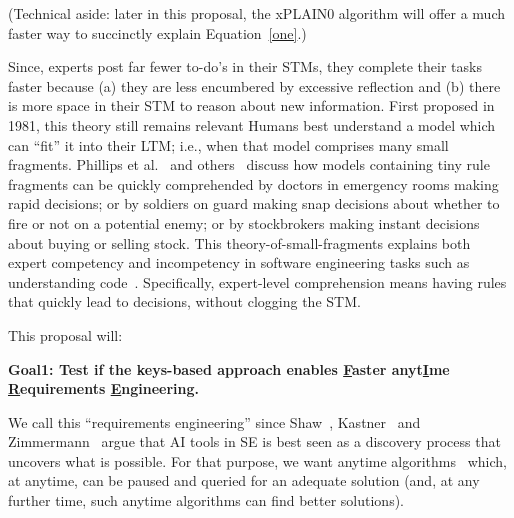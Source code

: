 (Technical aside: later in this proposal,
the xPLAIN0 algorithm will offer a much faster
way to succinctly explain Equation~\ref{one}.)  

 






Since, experts post far fewer to-do's  in their STMs, they complete their tasks faster because (a) they are less encumbered by excessive reflection and (b) there is more space in their STM to reason about new information. 
First proposed in 1981, this   theory  still remains relevant
Humans best understand a model
which can ``fit'' it into their LTM; i.e., when that model comprises many small fragments.
Phillips et al.~\cite{phillips2017FFTrees} and others~\cite{gigerenzer2008heuristics,gigerenzer2011heuristic,czerlinski1999good} discuss how models containing tiny rule fragments can be  quickly comprehended by 
doctors in emergency rooms making rapid  decisions; or by soldiers on guard  making snap decisions about whether to fire or not on a potential enemy; or by  stockbrokers making instant decisions about buying or selling stock.
This theory-of-small-fragments explains both expert competency and incompetency in software
engineering tasks such as understanding code~\cite{Wi96}. 
Specifically,   expert-level comprehension means
having rules that   quickly lead to decisions, without clogging the STM.

 


This proposal will:
  
  \begin{center}
 {\bf Goal1: Test if the keys-based {\IT} approach     enables
          \underline{F}aster 
               anyt\underline{I}me 
                \underline{R}equirements 
                \underline{E}ngineering.
                }
 \end{center}
We call this ``requirements engineering''  
 since   Shaw~\cite{shaw1980becoming}, Kastner~\cite{kastner20}
 and Zimmermann~\cite{timzim13} argue that 
 AI tools  in SE is best seen as a  discovery process that uncovers
 what is possible. For that purpose,
 we want anytime
algorithms~\cite{zilberstein1996using} which, at anytime,
 can be paused and queried for an adequate solution
 (and,
 at any further time, such anytime algorithms can
 find  better solutions).
  
